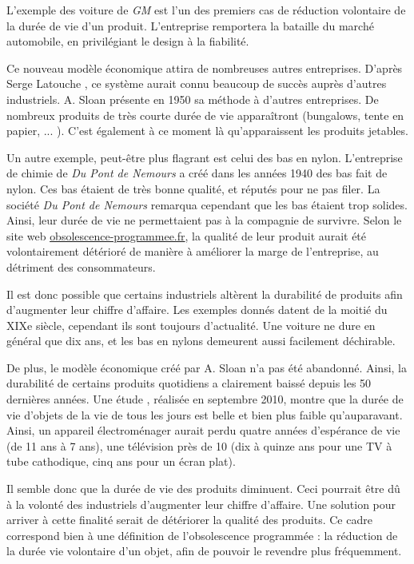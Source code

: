 \bigbreak

L'exemple des voiture de \textit{GM} est l'un des premiers cas de réduction volontaire de la durée de vie d'un produit. L'entreprise remportera la bataille du marché automobile, en privilégiant le design à la fiabilité.

Ce nouveau modèle économique attira de nombreuses autres entreprises. D'après Serge Latouche \cite{bpc}, ce système aurait connu beaucoup de succès auprès d'autres industriels. A. Sloan présente en 1950 sa méthode à d'autres entreprises. De nombreux produits de très courte durée de vie apparaîtront (bungalows, tente en papier, ... ). C'est également à ce moment là qu'apparaissent les produits jetables.
 
 
\bigbreak
Un autre exemple, peut-être plus flagrant est celui des bas en nylon.
L'entreprise de chimie de \textit{Du Pont de Nemours} a créé dans les années 1940 des bas fait de nylon.
Ces bas étaient de très bonne qualité, et réputés pour ne pas filer. La société \textit{Du Pont de Nemours} remarqua cependant que les bas étaient trop solides. 
Ainsi, leur durée de vie ne permettaient pas à la compagnie de survivre.
Selon le site web \url{obsolescence-programmee.fr},  la qualité de leur produit aurait été volontairement détérioré de manière à améliorer la marge de l'entreprise, au détriment des consommateurs. 

\bigbreak
Il est donc possible que certains industriels altèrent la durabilité de produits afin d'augmenter leur chiffre d'affaire. Les exemples donnés datent de la moitié du XIXe siècle, cependant ils sont toujours d'actualité. Une voiture ne dure en général que dix ans, et les bas en nylons demeurent aussi facilement déchirable. 

De plus, le modèle économique créé par A. Sloan n'a pas été abandonné. Ainsi, la durabilité de certains produits quotidiens a clairement baissé depuis les 50 dernières années. 
Une étude \cite{opSsg}, réalisée en septembre 2010, montre que la durée de vie d'objets de la vie de tous les jours est belle et bien plus faible qu'auparavant.
Ainsi, un appareil électroménager aurait perdu quatre années d'espérance de vie (de 11 ans à 7 ans), une télévision près de 10 (dix à quinze ans pour une TV à tube cathodique, cinq ans pour un écran plat). 

\bigbreak

Il semble donc que la durée de vie des produits diminuent. Ceci pourrait être dû à la volonté des industriels d'augmenter leur chiffre d'affaire. Une solution pour arriver à cette finalité serait de détériorer la qualité des produits. Ce cadre correspond  bien à une définition de l'obsolescence programmée : la réduction de la durée vie volontaire d'un objet, afin de pouvoir le revendre plus fréquemment. 
